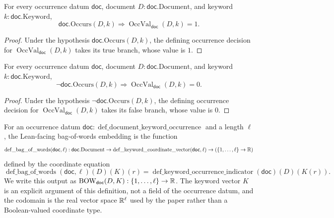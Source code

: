 \begin{lemma}
  \label{lem:keyword-occurrence-indicator-present}
  For every occurrence datum $\mathsf{doc}$, document
  $D:\mathsf{doc}.\mathrm{Document}$, and keyword
  $k:\mathsf{doc}.\mathrm{Keyword}$,
  \[
    \mathsf{doc}.\mathrm{Occurs}(D,k)\Rightarrow
    \operatorname{OccVal}_{\mathsf{doc}}(D,k)=1.
  \]
\end{lemma}
\begin{proof}
  Under the hypothesis $\mathsf{doc}.\mathrm{Occurs}(D,k)$, the defining
  occurrence decision for $\operatorname{OccVal}_{\mathsf{doc}}(D,k)$ takes
  its true branch, whose value is $1$.
\end{proof}

\begin{lemma}
  \label{lem:keyword-occurrence-indicator-absent}
  For every occurrence datum $\mathsf{doc}$, document
  $D:\mathsf{doc}.\mathrm{Document}$, and keyword
  $k:\mathsf{doc}.\mathrm{Keyword}$,
  \[
    \neg\mathsf{doc}.\mathrm{Occurs}(D,k)\Rightarrow
    \operatorname{OccVal}_{\mathsf{doc}}(D,k)=0.
  \]
\end{lemma}
\begin{proof}
  Under the hypothesis $\neg\mathsf{doc}.\mathrm{Occurs}(D,k)$, the defining
  occurrence decision for $\operatorname{OccVal}_{\mathsf{doc}}(D,k)$ takes
  its false branch, whose value is $0$.
\end{proof}

\begin{definition}
  \label{def:bag-of-words}
  For an occurrence datum
  $\mathsf{doc}:\operatorname{def\_document\_keyword\_occurrence}$ and a length
  $\ell$, the Lean-facing bag-of-words embedding is the function
  \[
    \operatorname{def\_bag\_of\_words}(\mathsf{doc},\ell):
      \mathsf{doc}.\mathrm{Document}\to
      \operatorname{def\_keyword\_coordinate\_vector}(\mathsf{doc},\ell)\to
      (\{1,\ldots,\ell\}\to\mathbb{R})
  \]
  defined by the coordinate equation
  \[
    \operatorname{def\_bag\_of\_words}(\mathsf{doc},\ell)(D)(K)(r)
      =
      \operatorname{def\_keyword\_occurrence\_indicator}
        (\mathsf{doc})(D)(K(r)).
  \]
  We write this output as
  $\mathrm{BOW}_{\mathsf{doc}}(D,K):\{1,\ldots,\ell\}\to\mathbb{R}$.  The keyword vector $K$ is
  an explicit argument of this definition, not a field of the occurrence datum,
  and the codomain is the real vector space $\mathbb{R}^\ell$ used by the paper rather
  than a Boolean-valued coordinate type.
\end{definition}

